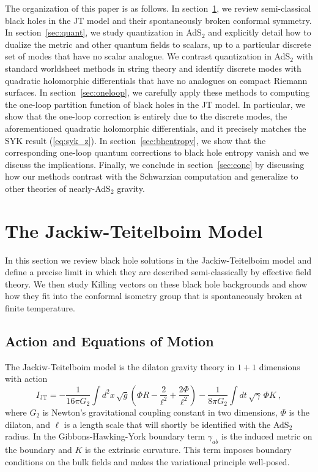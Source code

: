 \documentclass[12pt]{article}
\begin{document}
The organization of this paper is as follows.  In section~\ref{sec:jt}, we review semi-classical black holes in the JT model and their spontaneously broken conformal symmetry.  In section~\ref{sec:quant}, we study quantization in AdS$_2$ and explicitly detail how to 
dualize the metric and other quantum fields to scalars, up to a particular discrete set of modes that have no scalar analogue.  
We contrast quantization in AdS$_2$ with standard worldsheet methods in string theory and identify discrete modes with quadratic holomorphic differentials that have no analogues on compact Riemann surfaces. 
In section~\ref{sec:oneloop}, we carefully apply these methods to computing the one-loop partition function of black holes in the JT model.  In particular, we show that the one-loop correction is entirely due to the discrete modes, the aforementioned quadratic holomorphic differentials, and it precisely matches the SYK result (\ref{eq:syk_z}).  In section~\ref{sec:bhentropy}, we show that the corresponding one-loop quantum corrections to black hole entropy vanish and we discuss the implications.  Finally, we conclude in section~\ref{sec:conc} by discussing how our methods contrast with the Schwarzian computation and generalize to other theories of nearly-AdS$_2$ gravity.

\section{The Jackiw-Teitelboim Model}
\label{sec:jt}

In this section we review black hole solutions in the Jackiw-Teitelboim model and define a precise limit in which they are described semi-classically by effective field theory. 
We then study Killing vectors on these black hole backgrounds and show how they fit into the conformal isometry group that is spontaneously broken at finite temperature. 

\subsection{Action and Equations of Motion}

The Jackiw-Teitelboim model is the dilaton gravity theory in $1+1$ dimensions with action
\begin{equation}
	I_\text{JT} = -\frac{1}{16\pi G_2}\int d^2x\,\sqrt{g}\left(\Phi R - \frac{2}{\ell^2} + \frac{2 \Phi}{\ell^2} \right) - \frac{1}{8\pi G_2}\int dt\,\sqrt{\gamma}\,\Phi K~,
\label{eq:sjt}
\end{equation}
where $G_2$ is Newton's gravitational coupling constant in two dimensions, $\Phi$ is the dilaton, and $\ell$ is a length scale that will shortly be identified with the AdS$_2$ radius. In the Gibbons-Hawking-York boundary term $\gamma_{ab}$ is the induced metric on the boundary and $K$ is the extrinsic curvature.  This term imposes boundary conditions on the bulk fields and makes the variational principle well-posed.  
\end{document}
